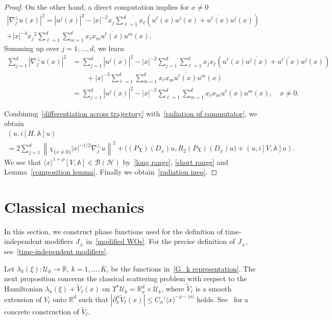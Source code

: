 \documentclass[10pt]{amsart}
\theoremstyle{definition}\newtheorem{defi}[theo]{Definition}\newtheorem{rema}[theo]{Remark}\newtheorem{exam}[theo]{Example}\newtheorem{exem}[theo]{Example}\newtheorem{nota}[theo]{Notation}
\renewcommand{\a}{\alpha}
\renewcommand{\l}{\lambda}
\newcommand{\x}{\xi}
\newcommand{\R}{\mathbb{R}}
\newcommand{\bbA}{\mathbb{A}}
\newcommand{\HS}{\mathcal{H}}
\newcommand{\US}{\mathcal{U}}
\newcommand{\BS}{\mathcal{B}}
\newcommand{\la}{\langle}
\newcommand{\ra}{\rangle}
\newcommand{\jap}[1]{\langle #1 \rangle}
\begin{document}
\begin{proof}
On the other hand, a direct computation implies for $x\neq0$
\begin{multline*}
\left| \nabla_{j}^\perp u (x) \right|^2 
= \left|u^j(x)\right|^2 - |x|^{-2} x_j \sum_{\ell=1}^d x_\ell \left(u^\ell(x)\overline{u^j(x)}+\overline{u^\ell(x)}u^j(x) \right) \\
+ |x|^{-4} {x_j}^2 \sum_{\ell=1}^d \sum_{m=1}^d x_\ell x_m \overline{u^\ell(x)}u^m(x).
\end{multline*}
Summing up over $j=1,\dots,d$, we learn
\begin{equation}\label{differentiation across trajectory}
\begin{split}
\sum_{j=1}^d \left| \nabla_{j}^\perp u (x) \right|^2 
&= \sum_{j=1}^d \left|u^j(x)\right|^2 - |x|^{-2} \sum_{j=1}^d \sum_{\ell=1}^d x_j x_\ell \left(u^\ell(x)\overline{u^j(x)}+\overline{u^\ell(x)}u^j(x) \right) \\
& \qquad + |x|^{-2} \sum_{\ell=1}^d \sum_{m=1}^d x_\ell x_m \overline{u^\ell(x)}u^m(x) \\
&= \sum_{j=1}^d \left|u^j(x)\right|^2 - |x|^{-2} \sum_{\ell=1}^d \sum_{m=1}^d x_\ell x_m \overline{u^\ell(x)}u^m(x), \quad x\neq0.
\end{split}
\end{equation}

Combining~\eqref{differentiation across trajectory} with~\eqref{radiation pf commutator}, we obtain
\begin{multline*}
\left(u, i[H,\bbA]u\right)\\
= 2\sum_{j=1}^d \left\| \chi_{\{x\neq0\}}|x|^{-1/2} \nabla_{j}^\perp u \right\|^2 
+ \bigl((P\chi)(D_x)u, R_2 (P\chi)(D_x)u\bigr) + (u, i[V,\bbA] u).
\end{multline*}
We see that $\jap{x}^{1+\rho} [V,\bbA] \in \BS(\HS)$ by~\eqref{long range}, \eqref{short range} and Lemma~\ref{composition lemma}. Finally we obtain~\eqref{radiation ineq}.
\end{proof}


\section{Classical mechanics}\label{classical section}

In this section, we construct phase functions used for the definition of time-independent modifiers $J_\pm$ in~\eqref{modified WOs}. For the precise definition of $J_\pm$, see~\eqref{time-independent modifiers}.

Let $\l_k(\x):\US_k\to\R$, $k=1,\dots,K$, be the functions in~\eqref{G_k representation}. The next proposition concerns the classical scattering problem with respect to the Hamiltonian $\l_k(\x)+\tilde V_\ell(x)$ on $T^*\US_k=\R_x^d\times\US_k$, where $\tilde V_\ell$ is a smooth extension of $V_\ell$ onto $\R^d$ such that $|\partial_x^\a \tilde V_\ell(x)|\leq C_\a' \la x \ra^{-\rho-|\a|}$ holds. See~\cite[Lemma~2.1]{N} for a concrete construction of $\tilde V_\ell$.
\end{document}
